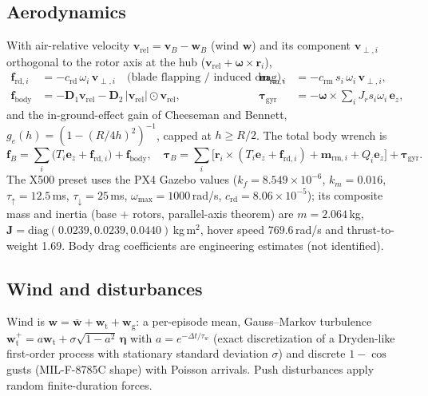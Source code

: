 \documentclass[11pt,a4paper]{article}
\newcommand{\vect}[1]{\bm{#1}}
\begin{document}
\subsection{Aerodynamics}
With air-relative velocity $\vect v_{\mathrm{rel}}=\vect v_B-\vect w_B$ (wind $\vect w$) and its component
$\vect v_{\perp,i}$ orthogonal to the rotor axis at the hub ($\vect v_{\mathrm{rel}}+\bm\omega\times\vect r_i$),
\begin{align}
\vect f_{\mathrm{rd},i} &= -c_{\mathrm{rd}}\,\omega_i\,\vect v_{\perp,i} \quad\text{(blade flapping / induced drag)},&
\vect m_{\mathrm{rm},i} &= -c_{\mathrm{rm}}\,s_i\,\omega_i\,\vect v_{\perp,i},\\
\vect f_{\mathrm{body}} &= -\vect D_1\vect v_{\mathrm{rel}} - \vect D_2\,|\vect v_{\mathrm{rel}}|\odot\vect v_{\mathrm{rel}}, &
\bm\tau_{\mathrm{gyr}} &= -\bm\omega\times\textstyle\sum_i J_r s_i\omega_i\,\vect e_z,
\end{align}
and the in-ground-effect gain of Cheeseman and Bennett, $g_e(h)=\left(1-(R/4h)^2\right)^{-1}$, capped at
$h\ge R/2$. The total body wrench is
\begin{equation}
\vect f_B=\sum_i\big(T_i\vect e_z+\vect f_{\mathrm{rd},i}\big)+\vect f_{\mathrm{body}},\quad
\bm\tau_B=\sum_i\big[\vect r_i\times(T_i\vect e_z+\vect f_{\mathrm{rd},i})+\vect m_{\mathrm{rm},i}+Q_i\vect e_z\big]+\bm\tau_{\mathrm{gyr}} .
\end{equation}
The X500 preset uses the PX4 Gazebo values ($k_f=8.549\times10^{-6}$, $k_m=0.016$, $\tau_\uparrow=12.5$\,ms,
$\tau_\downarrow=25$\,ms, $\omega_{\max}=1000$\,rad/s, $c_{\mathrm{rd}}=8.06\times10^{-5}$); its composite mass and
inertia (base + rotors, parallel-axis theorem) are $m=2.064$\,kg, $\vect J=\mathrm{diag}(0.0239,0.0239,0.0440)$\,kg\,m$^2$,
hover speed $769.6$\,rad/s and thrust-to-weight 1.69. Body drag coefficients are engineering estimates (not identified).

\subsection{Wind and disturbances}
Wind is $\vect w=\bar{\vect w}+\vect w_{\mathrm{t}}+\vect w_{\mathrm{g}}$: a per-episode mean, Gauss--Markov turbulence
$\vect w_{\mathrm t}^{+}=a\vect w_{\mathrm t}+\sigma\sqrt{1-a^2}\,\bm\eta$ with $a=e^{-\Delta t/\tau_w}$ (exact
discretization of a Dryden-like first-order process with stationary standard deviation $\sigma$) and discrete
$1-\cos$ gusts (MIL-F-8785C shape) with Poisson arrivals. Push disturbances apply random finite-duration forces.
\end{document}
